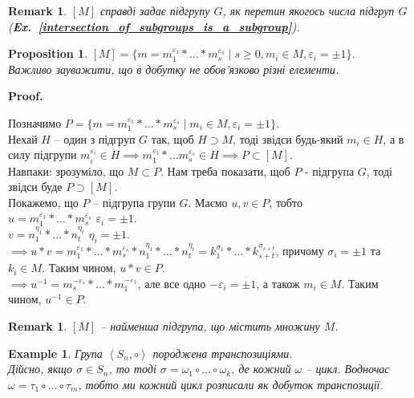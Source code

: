 \documentclass[a4paper, 10pt]{article}
\makeatletter
\theoremstyle{theoremdd}
\theoremstyle{theoremdd}
\theoremstyle{theoremdd}
\theoremstyle{theoremdd}
\theoremstyle{theoremdd}
\newtheorem{example}[theorem]{Example}
\theoremstyle{theoremdd}
\theoremstyle{theoremdd}
\theoremstyle{theoremdd}
\theoremstyle{theoremdd}
\newtheorem{proposition}[theorem]{Proposition}
\theoremstyle{theoremdd}
\theoremstyle{theoremdd}
\newtheorem{remark}[theorem]{Remark}
\theoremstyle{theoremdd}
\theoremstyle{theoremdd}
\theoremstyle{theoremdd}
\theoremstyle{theoremdd}
\renewenvironment{proof}[1][Proof.\\]{\par
\pushQED{\hfill \qed}%
\normalfont \topsep6\p@\@plus6\p@\relax
\trivlist
\item\relax
{\bfseries
#1\@addpunct{.}}\hspace\labelsep\ignorespaces
}{%
\popQED\endtrivlist\@endpefalse
}
\newcommand\exref[1]{\textbf{Ex.~\ref{#1}}}
\makeatother
\begin{document}
\begin{remark}
$[M]$ справді задає підгрупу $G$, як перетин якогось числа підгруп $G$ (\exref{intersection_of_subgroups_is_a_subgroup}).
\end{remark}

\begin{proposition}
$[M] = \{ m = m_1^{\varepsilon_1} * \dots * m_s^{\varepsilon_s} \mid s \geq 0, m_i \in M, \varepsilon_i = \pm 1 \}$.\\
Важливо зауважити, що в добутку не обов'язково різні елементи.
\end{proposition}

\begin{proof}
Позначимо $P = \{ m = m_1^{\varepsilon_1} * \dots * m_s^{\varepsilon_s} \mid m_i \in M, \varepsilon_i = \pm 1 \}$.\\
Нехай $H$ -- один з підгруп $G$ так, щоб $H \supset M$, тоді звідси будь-який $m_i \in H$, а в силу підгрупи $m_i^{\varepsilon_i} \in H \implies m_1^{\varepsilon_1} * \dots m_s^{\varepsilon_s} \in H \implies P \subset [M]$.\\
Навпаки: зрозуміло, що $M \subset P$. Нам треба показати, щоб $P$ - підгрупа $G$, тоді звідси буде $P \supset [M]$.
\bigskip \\
Покажемо, що $P$ -- підгрупа групи $G$. Маємо $u,v \in P$, тобто\\
$u = m_1^{\varepsilon_1} * \dots * m_s^{\varepsilon_s}$ \hspace{1cm} $\varepsilon_i = \pm 1$.\\
$v = n_1^{\eta_1} * \dots * n_t^{\eta_t}$ \hspace{1cm} $\eta_i = \pm 1$.\\
$\implies u*v = m_1^{\varepsilon_1} * \dots * m_s^{\varepsilon_s} * n_1^{\eta_1} * \dots * n_t^{\eta_t} = k_1^{\sigma_1} * \dots * k_{s+t}^{\sigma_{s+t}}$, причому $\sigma_i = \pm 1$ та $k_i \in M$. Таким чином, $u*v \in P$.\\
$\implies u^{-1} = m_s^{-\varepsilon_s} * \dots * m_1^{-\varepsilon_1}$, але все одно $-\varepsilon_i = \pm 1$, а також $m_i \in M$. Таким чином, $u^{-1} \in P$.
\end{proof}

\begin{remark}
$[M]$ -- найменша підгрупа, що містить множину $M$.
\end{remark}

\begin{example}
Група $\left< S_n, \circ \right>$ породжена транспозиціями.\\
Дійсно, якщо $\sigma \in S_n$, то тоді $\sigma = \omega_1 \circ \dots \circ \omega_k$, де кожний $\omega$ -- цикл. Водночас $\omega = \tau_1 \circ \dots \circ \tau_m$, тобто ми кожний цикл розписали як добуток транспозиції. 
\end{example}
\end{document}
